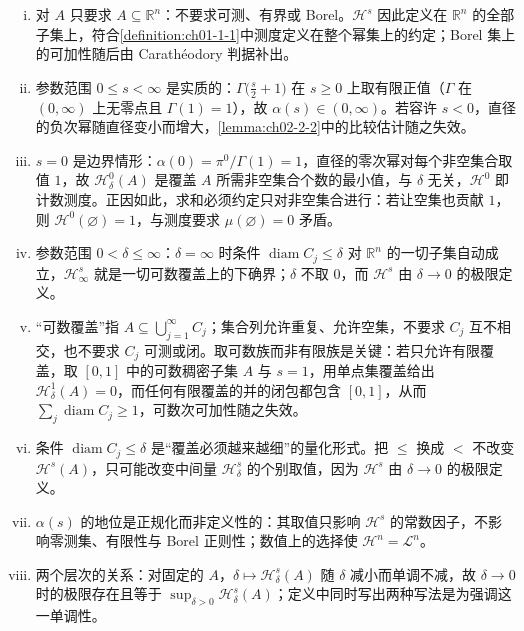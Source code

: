 \documentclass[../../main.tex]{subfiles}%
\begin{document}
\begin{remark}\label{remark:ch02-def-2-1-条件}
\begin{enumerate}[(i)]
\item 对 $A$ 只要求 $A\subseteq\mathbb{R}^n$：不要求可测、有界或 Borel。$\mathcal{H}^s$ 因此定义在 $\mathbb{R}^n$ 的全部子集上，符合\cref{definition:ch01-1-1}中测度定义在整个幂集上的约定；Borel 集上的可加性随后由 Carathéodory 判据补出。%
\item 参数范围 $0\leqslant s<\infty$ 是实质的：$\Gamma\bigl(\frac{s}{2}+1\bigr)$ 在 $s\geqslant0$ 上取有限正值（$\Gamma$ 在 $(0,\infty)$ 上无零点且 $\Gamma(1)=1$），故 $\alpha(s)\in(0,\infty)$。若容许 $s<0$，直径的负次幂随直径变小而增大，\cref{lemma:ch02-2-2}中的比较估计随之失效。%
\item $s=0$ 是边界情形：$\alpha(0)=\pi^0/\Gamma(1)=1$，直径的零次幂对每个非空集合取值 $1$，故 $\mathcal{H}^0_\delta(A)$ 是覆盖 $A$ 所需非空集合个数的最小值，与 $\delta$ 无关，$\mathcal{H}^0$ 即计数测度。正因如此，求和必须约定只对非空集合进行：若让空集也贡献 $1$，则 $\mathcal{H}^0(\varnothing)=1$，与测度要求 $\mu(\varnothing)=0$ 矛盾。
\item 参数范围 $0<\delta\leqslant\infty$：$\delta=\infty$ 时条件 $\operatorname{diam}C_j\leqslant\delta$ 对 $\mathbb{R}^n$ 的一切子集自动成立，$\mathcal{H}^s_\infty$ 就是一切可数覆盖上的下确界；$\delta$ 不取 $0$，而 $\mathcal{H}^s$ 由 $\delta\to0$ 的极限定义。
\item “可数覆盖”指 $A\subseteq\bigcup_{j=1}^{\infty}C_j$；集合列允许重复、允许空集，不要求 $C_j$ 互不相交，也不要求 $C_j$ 可测或闭。取可数族而非有限族是关键：若只允许有限覆盖，取 $[0,1]$ 中的可数稠密子集 $A$ 与 $s=1$，用单点集覆盖给出 $\mathcal{H}^1_\delta(A)=0$，而任何有限覆盖的并的闭包都包含 $[0,1]$，从而 $\sum_j\operatorname{diam}C_j\geqslant1$，可数次可加性随之失效。
\item 条件 $\operatorname{diam}C_j\leqslant\delta$ 是“覆盖必须越来越细”的量化形式。把 $\leqslant$ 换成 $<$ 不改变 $\mathcal{H}^s(A)$，只可能改变中间量 $\mathcal{H}^s_\delta$ 的个别取值，因为 $\mathcal{H}^s$ 由 $\delta\to0$ 的极限定义。
\item $\alpha(s)$ 的地位是正规化而非定义性的：其取值只影响 $\mathcal{H}^s$ 的常数因子，不影响零测集、有限性与 Borel 正则性；数值上的选择使 $\mathcal{H}^n=\mathcal{L}^n$。
\item 两个层次的关系：对固定的 $A$，$\delta\mapsto\mathcal{H}^s_\delta(A)$ 随 $\delta$ 减小而单调不减，故 $\delta\to0$ 时的极限存在且等于 $\sup_{\delta>0}\mathcal{H}^s_\delta(A)$；定义中同时写出两种写法是为强调这一单调性。
\end{enumerate}
\end{remark}
\end{document}
